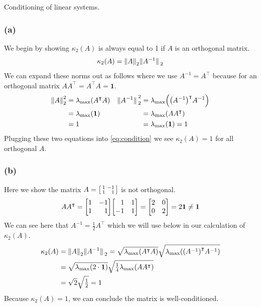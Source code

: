 \documentclass[boxes,pages]{homework}
\newcommand{\tpose}[1]{#1^\intercal}
\newcommand{\inv}[1]{#1^{-1}}
\begin{document}
\begin{problem}
Conditioning of linear systems.
\end{problem}

\begin{solution}
	\subsubsection*{(a)}
	We begin by showing $\kappa_2(A)$ is always equal to 1 if $A$ is an orthogonal matrix.
	\begin{equation}\label{eq:condition}
		\kappa_2(A) = \norm{A}_2\norm*{\inv{A}}_2
	\end{equation}
	We can expand these norms out as follows where we use $\inv{A} = \tpose{A}$ because for an orthogonal matrix $A\tpose{A} = \tpose{A}A = \mathbf{1}$.
	\begin{align*}
		\norm{A}_2^2 & = \lambda_\text{max}\qty(\tpose{A}A) & \norm*{\inv{A}}_2^2 & = \lambda_\text{max}\qty(\tpose{\qty(\inv{A})}\inv{A}) \\
		             & = \lambda_\text{max}\qty(\mathbf{1}) &                     & = \lambda_\text{max}\qty(A\tpose{A})                   \\
		             & = 1                                  &                     & = \lambda_\text{max}\qty(\mathbf{1}) = 1
	\end{align*}
	Plugging these two equations into \cref{eq:condition} we see $\kappa_2(A) = 1$ for all orthogonal $A$.

	\subsubsection*{(b)}
	Here we show the matrix $A = \smqty[1 & -1 \\ 1 & \phantom{-}1]$ is not orthogonal.
	\begin{equation*}
		A\tpose{A} = \mqty[1 & -1 \\ 1 & \phantom{-}1]\mqty[\phantom{-}1 & 1 \\ -1 & 1] = \mqty[2 & 0 \\ 0 & 2] = 2\mathbf{1} \neq \mathbf{1}
	\end{equation*}
	We can see here that $\inv{A} = \frac{1}{2}\tpose{A}$ which we will use below in our calculation of $\kappa_2(A)$.
	\begin{align*}
		\kappa_2(A) & = \norm{A}_2\norm*{\inv{A}}_2 = \sqrt{\lambda_\text{max}\qty(\tpose{A}A)}\sqrt{\lambda_\text{max}\qty(\tpose{\qty(\inv{A})}\inv{A})} \\
		            & = \sqrt{\lambda_\text{max}\qty(2\cdot\mathbf{1})}\sqrt{\tfrac{1}{4}\lambda_\text{max}\qty(A\tpose{A})}                               \\
		            & = \sqrt{2}\sqrt{\tfrac{1}{2}} = 1
	\end{align*}
	Because $\kappa_2(A) = 1$, we can conclude the matrix is well-conditioned.


\end{solution}
\end{document}
